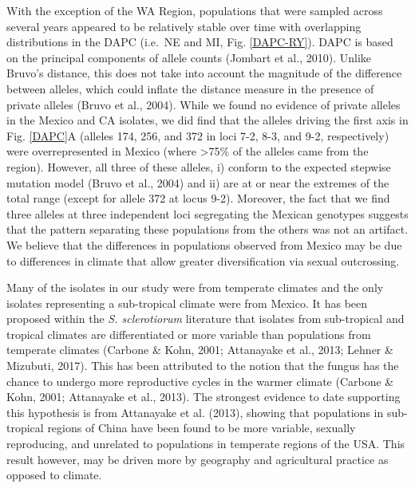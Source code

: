 \documentclass[fleqn,10pt,lineno]{wlpeerj} %
\theoremstyle{definition}
\theoremstyle{definition}
\theoremstyle{definition}
\theoremstyle{remark}
\begin{document}
With the exception of the WA Region, populations that were sampled
across several years appeared to be relatively stable over time with
overlapping distributions in the DAPC (i.e.~NE and MI, Fig.
\ref{DAPC-RY}). DAPC is based on the principal components of allele
counts (Jombart et al., 2010). Unlike Bruvo's distance, this does not
take into account the magnitude of the difference between alleles, which
could inflate the distance measure in the presence of private alleles
(Bruvo et al., 2004). While we found no evidence of private alleles in
the Mexico and CA isolates, we did find that the alleles driving the
first axis in Fig. \ref{DAPC}A (alleles 174, 256, and 372 in loci 7-2,
8-3, and 9-2, respectively) were overrepresented in Mexico (where
\textgreater{}75\% of the alleles came from the region). However, all
three of these alleles, i) conform to the expected stepwise mutation
model (Bruvo et al., 2004) and ii) are at or near the extremes of the
total range (except for allele 372 at locus 9-2). Moreover, the fact
that we find three alleles at three independent loci segregating the
Mexican genotypes suggests that the pattern separating these populations
from the others was not an artifact. We believe that the differences in
populations observed from Mexico may be due to differences in climate
that allow greater diversification via sexual outcrossing.

Many of the isolates in our study were from temperate climates and the
only isolates representing a sub-tropical climate were from Mexico. It
has been proposed within the \emph{S. sclerotiorum} literature that
isolates from sub-tropical and tropical climates are differentiated or
more variable than populations from temperate climates (Carbone \& Kohn,
2001; Attanayake et al., 2013; Lehner \& Mizubuti, 2017). This has been
attributed to the notion that the fungus has the chance to undergo more
reproductive cycles in the warmer climate (Carbone \& Kohn, 2001;
Attanayake et al., 2013). The strongest evidence to date supporting this
hypothesis is from Attanayake et al. (2013), showing that populations in
sub-tropical regions of China have been found to be more variable,
sexually reproducing, and unrelated to populations in temperate regions
of the USA. This result however, may be driven more by geography and
agricultural practice as opposed to climate.
\end{document}
